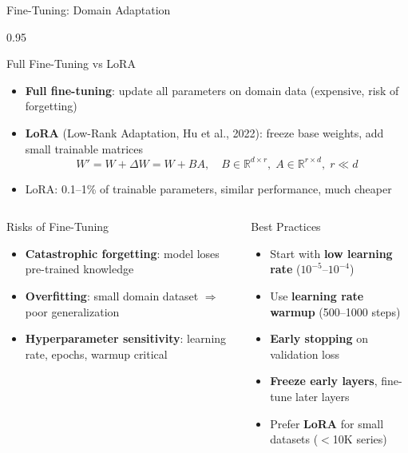 \documentclass[9pt, aspectratio=169, t]{beamer}
\begin{document}
\begin{frame}{Fine-Tuning: Domain Adaptation}
    \begin{cminipage}{0.95\textwidth}
    \vspace{-2mm}
    \begin{block}{Full Fine-Tuning vs LoRA}
        {\small
        \begin{itemize}\setlength{\itemsep}{0pt}
            \item \textbf{Full fine-tuning}: update all parameters on domain data (expensive, risk of forgetting)
            \item \textbf{LoRA} (Low-Rank Adaptation, Hu et al., 2022): freeze base weights, add small trainable matrices
            $$W' = W + \Delta W = W + BA, \quad B \in \mathbb{R}^{d \times r},\; A \in \mathbb{R}^{r \times d},\; r \ll d$$
            \item LoRA: 0.1--1\% of trainable parameters, similar performance, much cheaper
        \end{itemize}
        }
    \end{block}
    \vspace{-2mm}
    \begin{columns}[T]
        \begin{alertblock}{Risks of Fine-Tuning}
            {\scriptsize
            \begin{itemize}\setlength{\itemsep}{0pt}
                \item \textbf{Catastrophic forgetting}: model loses pre-trained knowledge
                \item \textbf{Overfitting}: small domain dataset $\Rightarrow$ poor generalization
                \item \textbf{Hyperparameter sensitivity}: learning rate, epochs, warmup critical
            \end{itemize}
            }
        \end{alertblock}

        \begin{exampleblock}{Best Practices}
            {\scriptsize
            \begin{itemize}\setlength{\itemsep}{0pt}
                \item Start with \textbf{low learning rate} ($10^{-5}$--$10^{-4}$)
                \item Use \textbf{learning rate warmup} (500--1000 steps)
                \item \textbf{Early stopping} on validation loss
                \item \textbf{Freeze early layers}, fine-tune later layers
                \item Prefer \textbf{LoRA} for small datasets ($<$10K series)
            \end{itemize}
            }
        \end{exampleblock}
    \end{columns}
    \end{cminipage}
\end{frame}
\end{document}

